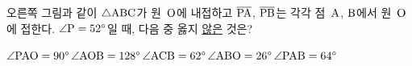 \noindent\begin{minipage}[t]{0.58\linewidth}\vspace{0pt}\raggedright 오른쪽 그림과 같이 $\triangle\mathrm{ABC}$가 원~$\mathrm{O}$에 내접하고 $\overline{\mathrm{PA}}$, $\overline{\mathrm{PB}}$는 각각 점~$\mathrm{A}$, $\mathrm{B}$에서 원~$\mathrm{O}$에 접한다. $\angle\mathrm{P}=52^\circ$일 때, 다음 중 옳지 \underline{않은} 것은?\end{minipage}\hfill\begin{minipage}[t]{0.4\linewidth}\vspace{0pt}\centering \resizebox{\ifdim\width>\linewidth\linewidth\else\width\fi}{!}{}\end{minipage}\par
\begin{choicesv}{$\angle\mathrm{PAO}=90^\circ$}{$\angle\mathrm{AOB}=128^\circ$}{$\angle\mathrm{ACB}=62^\circ$}{$\angle\mathrm{ABO}=26^\circ$}{$\angle\mathrm{PAB}=64^\circ$}\end{choicesv}
